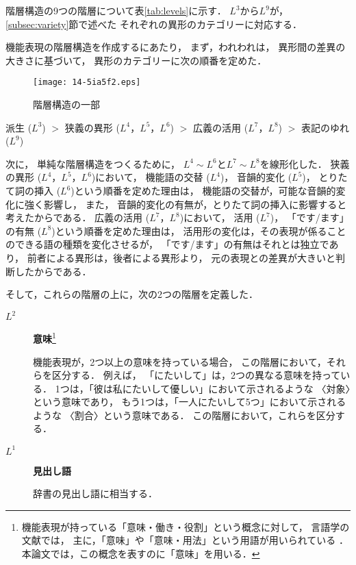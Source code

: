 \documentclass[japanese]{jnlp_1.3e}
\begin{document}
階層構造の9つの階層について表\ref{tab:levels}に示す．
$L^3$から$L^9$が，\ref{subsec:variety}節で述べた
それぞれの異形のカテゴリーに対応する．

機能表現の階層構造を作成するにあたり，
まず，われわれは，
異形間の差異の大きさに基づいて，
異形のカテゴリーに次の順番を定めた．

\begin{figure}[t]
\begin{center}
\texttt{[image: 14-5ia5f2.eps]}
\end{center}
\caption{階層構造の一部}
\label{fig:hierarchy}
\end{figure}

\begin{table}[t]

\end{table}

派生 ($L^3$) $>$
狭義の異形 ($L^4$，$L^5$，$L^6$) $>$ 
広義の活用 ($L^7$，$L^8$) $>$
表記のゆれ ($L^9$)

次に，
単純な階層構造をつくるために，
$L^4 \sim L^6$と$L^7 \sim L^8$を線形化した．
狭義の異形 ($L^4$，$L^5$，$L^6$)において，
機能語の交替 ($L^4$)，
音韻的変化 ($L^5$)，
とりたて詞の挿入 ($L^6$)という順番を定めた理由は，
機能語の交替が，可能な音韻的変化に強く影響し，
また，
音韻的変化の有無が，とりたて詞の挿入に影響すると
考えたからである．
広義の活用 ($L^7$，$L^8$)において，
活用 ($L^7$)，
「です/ます」の有無 ($L^8$)という順番を定めた理由は，
活用形の変化は，その表現が係ることのできる語の種類を変化させるが，
「です/ます」の有無はそれとは独立であり，
前者による異形は，後者による異形より，
元の表現との差異が大きいと判断したからである．

そして，これらの階層の上に，次の2つの階層を定義した．
\begin{description}
 \item[$L^2$] {\bf 意味}\footnote{
機能表現が持っている「意味・働き・役割」という概念に対して，
言語学の文献では，
主に，「意味」や「意味・用法」という用語が用いられている
．
本論文では，この概念を表すのに「意味」を用いる．
}
            
            機能表現が，2つ以上の意味を持っている場合，
            この階層において，それらを区分する．                        
            例えば，
            「にたいして」は，2つの異なる意味を持っている．
            1つは，「彼は私にたいして優しい」において示されるような
            〈対象〉という意味であり，
            もう1つは，「一人にたいして5つ」において示されるような
            〈割合〉という意味である．
            この階層において，これらを区分する．

 \item[$L^1$] {\bf 見出し語}

            辞書の見出し語に相当する．
\end{description}
\end{document}
